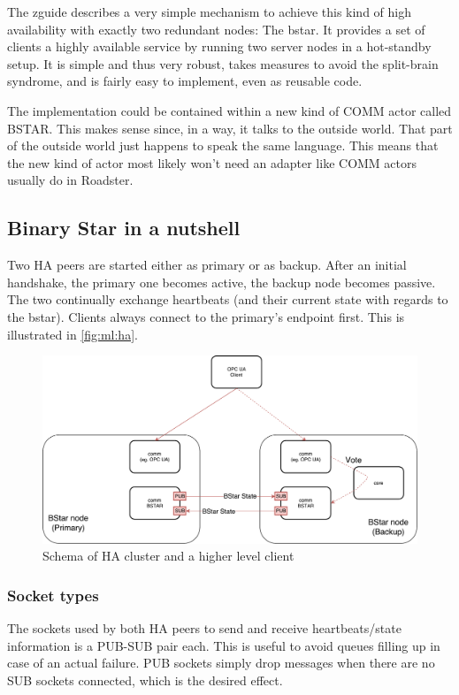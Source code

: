 The \gls{zguide} describes a very simple mechanism to achieve this kind of high
availability with exactly two redundant nodes: The \gls{bstar}. It
provides a set of clients a highly available service by running two server
nodes in a hot-standby setup. It is simple and thus very robust, takes measures to avoid the
split-brain syndrome, and is fairly easy to implement, even as reusable
code.

The implementation could be contained within a new kind of COMM actor
called BSTAR. This makes sense since, in a way, it talks to the outside world.
That part of the outside world just happens to speak the same language. This
means that the new kind of actor most likely won't need an adapter like COMM
actors usually do in Roadster.

\subsection{Binary Star in a nutshell}
Two HA peers are started either as primary or as backup. After an initial
handshake, the primary one becomes active, the backup node becomes passive. The
two continually exchange heartbeats (and their current state with regards to
the \gls{bstar}). Clients always connect to the primary's endpoint first. This
is illustrated in \autoref{fig:ml:ha}.

\begin{figure}[]
	\includegraphics[width=\textwidth]{img/ML-HA_bstar.pdf}
	\caption{Schema of HA cluster and a higher level client}
	\label{fig:ml:ha}
\end{figure}

\subsubsection{Socket types}
The sockets used by both HA peers to send and receive heartbeats/state
information is a PUB-SUB pair each. This is useful to avoid queues filling up
in case of an actual failure. PUB sockets simply drop messages when there are
no SUB sockets connected, which is the desired effect.

